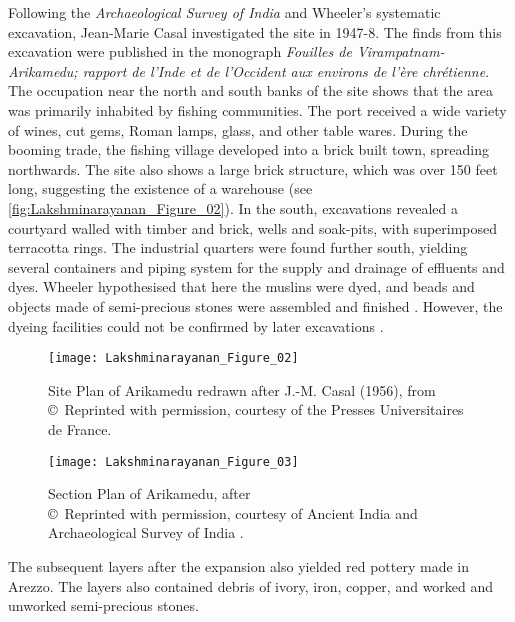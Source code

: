 Following the \emph{Archaeological Survey of India} and Wheeler’s systematic excavation, Jean-Marie Casal investigated the site in 1947-8. The finds from this excavation were published in the monograph \emph{Fouilles de Virampatnam-Arikamedu; rapport de l'Inde et de l'Occident aux environs de l'ère chrétienne}. The occupation near the north and south banks of the site shows that the area was primarily inhabited by fishing communities. The port received a wide variety of wines, cut gems, Roman lamps, glass, and other table wares. During the booming trade, the fishing village developed into a brick built town, spreading northwards. The site also shows a large brick structure, which was over \num{150} feet long, suggesting the existence of a warehouse (see \cref{fig:Lakshminarayanan_Figure_02}). In the south, excavations revealed a courtyard walled with timber and brick, wells and soak-pits, with superimposed terracotta rings. The industrial quarters were found further south, yielding several containers and piping system for the supply and drainage of effluents and dyes. Wheeler hypothesised that here the muslins were dyed, and beads and objects made of semi-precious stones were assembled and finished \parencite{wheeler1946}. However, the dyeing facilities could not be confirmed by later excavations \parencite[][109]{begley1996}.

\begin{figure}[!tb]
\begin{minipage}[t]{.49\linewidth}
	\texttt{[image: Lakshminarayanan\_Figure\_02]}
	\caption{Site Plan of Arikamedu redrawn after J.-M. Casal (1956), from \textcite[][465]{begley1983}\\
		{\normalfont\scriptsize\copyright\ Reprinted with permission, courtesy of the Presses Universitaires de France.
	}}
	\label{fig:Lakshminarayanan_Figure_02}
\end{minipage}\hfill
\begin{minipage}[t]{.49\linewidth}
	\texttt{[image: Lakshminarayanan\_Figure\_03]}
	\caption{Section Plan of Arikamedu, after \textcite{wheeler1946}\\
		{\normalfont\scriptsize\copyright\ Reprinted with permission, courtesy of Ancient India and Archaeological Survey of India \parencite[][468]{begley1983}.
	}}
	\label{fig:Lakshminarayanan_Figure_03}
\end{minipage}
\end{figure}

The subsequent layers after the expansion also yielded red pottery made in Arezzo. The layers also contained debris of ivory, iron, copper, and worked and unworked semi-precious stones.

